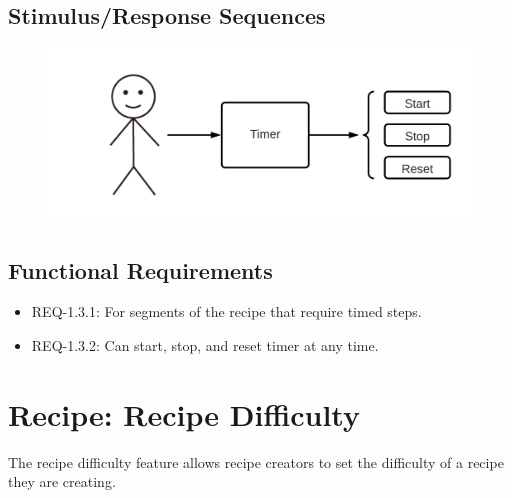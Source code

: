 \documentclass{scrreprt}
\begin{document}
\subsection{Stimulus/Response Sequences}

\begin{figure}[H]\centering
    \includegraphics[width=\columnwidth]{FlowCharts/Recipe-Timer.png}
\end{figure}

\subsection{Functional Requirements}

\begin{itemize}
    \item REQ-1.3.1: For segments of the recipe that require timed steps.
    \item REQ-1.3.2: Can start, stop, and reset timer at any time.
\end{itemize}

\section{Recipe: Recipe Difficulty}

The recipe difficulty feature allows recipe creators to set the difficulty of a recipe they are creating.
\end{document}
